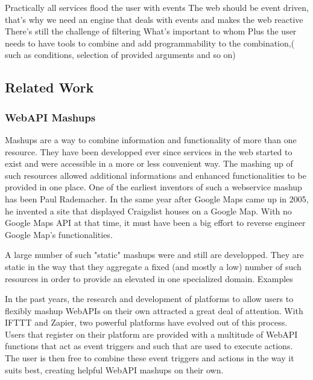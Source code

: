 \documentclass[11pt]{article}%
\begin{document}
Practically all services flood the user with events
The web should be event driven, that's why we need an engine that deals with events and makes the web reactive
There's still the challenge of filtering
What's important to whom
Plus the user needs to have tools to combine and add programmability to the combination,( such as conditions, selection of provided arguments and so on)



\subsection{Related Work}
%


\subsubsection{WebAPI Mashups}
Mashups are a way to combine information and functionality of more than one resource.
They have been developped ever since services in the web started to exist and were accessible in a more or less convenient way.
The mashing up of such resources allowed additional informations and enhanced functionalities to be provided in one place.
One of the earliest inventors of such a webservice mashup has been Paul Rademacher.
In the same year after Google Maps came up in 2005, he invented a site\cite{rademacherOne,rademacherTwo} that displayed Craigslist houses on a Google Map.
With no Google Maps API at that time, it must have been a big effort to reverse engineer Google Map's functionalities.

A large number of such "static" mashups were and still are developped.
They are static in the way that they aggregate a fixed (and mostly a low) number of such resources in order to provide an elevated in one specialized domain.
Examples

In the past years, the research and development of platforms to allow users to flexibly mashup WebAPIs on their own attracted a great deal of attention.
With IFTTT and Zapier, two powerful platforms have evolved out of this process.
Users that register on their platform are provided with a multitude of WebAPI functions that act as event triggers and such that are used to execute actions.
The user is then free to combine these event triggers and actions in the way it suits best, creating helpful WebAPI mashups on their own.
\end{document}

